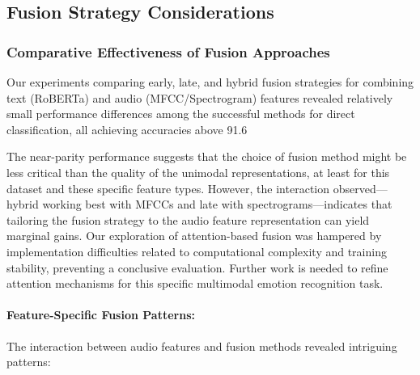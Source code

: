 \documentclass[12pt]{article}
\begin{document}
\subsection{Fusion Strategy Considerations}

\subsubsection{Comparative Effectiveness of Fusion Approaches}
Our experiments comparing early, late, and hybrid fusion strategies for combining text (RoBERTa) and audio (MFCC/Spectrogram) features revealed relatively small performance differences among the successful methods for direct classification, all achieving accuracies above 91.6%

The near-parity performance suggests that the choice of fusion method might be less critical than the quality of the unimodal representations, at least for this dataset and these specific feature types. However, the interaction observed—hybrid working best with MFCCs and late with spectrograms—indicates that tailoring the fusion strategy to the audio feature representation can yield marginal gains. Our exploration of attention-based fusion was hampered by implementation difficulties related to computational complexity and training stability, preventing a conclusive evaluation. Further work is needed to refine attention mechanisms for this specific multimodal emotion recognition task.

\paragraph{Feature-Specific Fusion Patterns:}
The interaction between audio features and fusion methods revealed intriguing patterns:
\end{document}
